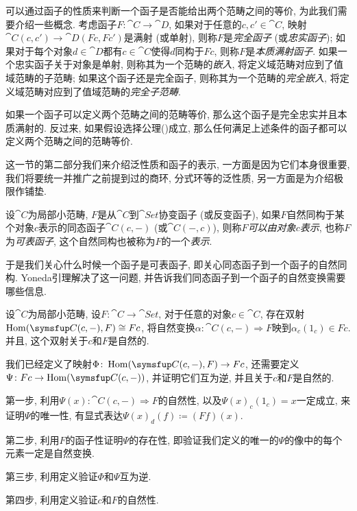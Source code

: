 可以通过函子的性质来判断一个函子是否能给出两个范畴之间的等价, 为此我们需要介绍一些概念. 考虑函子$F\colon\cat{C}\to\cat{D}$, 如果对于任意的$c, c'\in \cat{C}$, 映射$\cat{C}(c, c')\to \cat{D}(Fc, Fc')$是满射 (或单射), 则称$F$是\emph{完全函子} (或\emph{忠实函子}); 如果对于每个对象$d\in \cat{D}$都有$c\in\cat{C}$使得$d$同构于$Fc$, 则称$F$是\emph{本质满射函子}. 如果一个忠实函子关于对象是单射, 则称其为一个范畴的\emph{嵌入}, 将定义域范畴对应到了值域范畴的子范畴; 如果这个函子还是完全函子, 则称其为一个范畴的\emph{完全嵌入}, 将定义域范畴对应到了值域范畴的\emph{完全子范畴}.

\begin{theoremnoproof}\label{thm:categoryequivalence}
  如果一个函子可以定义两个范畴之间的范畴等价, 那么这个函子是完全忠实并且本质满射的. 反过来, 如果假设选择公理()成立, 那么任何满足上述条件的函子都可以定义两个范畴之间的范畴等价.
\end{theoremnoproof}

\bigskip

这一节的第二部分我们来介绍泛性质和函子的表示, 一方面是因为它们本身很重要, 我们将要统一并推广之前提到过的商环, 分式环等的泛性质, 另一方面是为介绍极限作铺垫.

设$\cat{C}$为局部小范畴, $F$是从$\cat{C}$到$\cat{Set}$协变函子 (或反变函子), 如果$F$自然同构于某个对象$c$表示的同态函子$\cat{C}(c, -)$ (或$\cat{C}(-, c)$), 则称$F$\emph{可以由对象$c$表示}, 也称$F$为\emph{可表函子}, 这个自然同构也被称为$F$的一个\emph{表示}.

于是我们关心什么时候一个函子是可表函子, 即关心同态函子到一个函子的自然同构. Yoneda引理解决了这一问题, 并告诉我们同态函子到一个函子的自然变换需要哪些信息.

\begin{theorem}\label{thm:yonedalemma}
  设$\cat{C}$为局部小范畴, 设$F\colon \cat{C}\to\cat{Set}$, 对于任意的对象$c\in\cat{C}$, 存在双射$\Hom (\cat{C}(c, -), F)\cong Fc$, 将自然变换$\alpha\colon \cat{C}(c, -)\Rightarrow F$映到$\alpha_c(1_c)\in Fc$. 并且, 这个双射关于$c$和$F$是自然的.
\end{theorem}

\begin{proofhint}
  我们已经定义了映射$\Phi\colon \Hom (\cat{C}(c, -), F)\to Fc$, 还需要定义$\Psi\colon Fc\to\Hom (\cat{C}(c, -))$, 并证明它们互为逆, 并且关于$c$和$F$是自然的.

  第一步, 利用$\Psi(x)\colon \cat{C}(c, -)\Rightarrow F$的自然性, 以及$\Psi(x)_c(1_c)=x$一定成立, 来证明$\Psi$的唯一性, 有显式表达$\Psi(x)_d(f)\coloneq (Ff)(x)$.

  第二步, 利用$F$的函子性证明$\Psi$的存在性, 即验证我们定义的唯一的$\Psi$的像中的每个元素一定是自然变换.

  第三步, 利用定义验证$\Phi$和$\Psi$互为逆.

  第四步, 利用定义验证$c$和$F$的自然性.
\end{proofhint}


